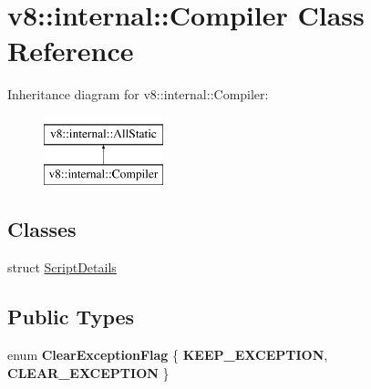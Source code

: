 \hypertarget{classv8_1_1internal_1_1Compiler}{}\section{v8\+:\+:internal\+:\+:Compiler Class Reference}
\label{classv8_1_1internal_1_1Compiler}
Inheritance diagram for v8\+:\+:internal\+:\+:Compiler\+:\begin{figure}[H]
\begin{center}
\leavevmode
\includegraphics[height=2.000000cm]{classv8_1_1internal_1_1Compiler}
\end{center}
\end{figure}
\subsection*{Classes}
\begin{DoxyCompactItemize}
\item 
struct \mbox{\hyperlink{structv8_1_1internal_1_1Compiler_1_1ScriptDetails}{Script\+Details}}
\end{DoxyCompactItemize}
\subsection*{Public Types}
\begin{DoxyCompactItemize}
\item 
\mbox{\label{classv8_1_1internal_1_1Compiler_ab59ab49f4051abae5d94e22871913b96}} 
enum {\bfseries Clear\+Exception\+Flag} \{ {\bfseries K\+E\+E\+P\+\_\+\+E\+X\+C\+E\+P\+T\+I\+ON}, 
{\bfseries C\+L\+E\+A\+R\+\_\+\+E\+X\+C\+E\+P\+T\+I\+ON}
 \}
\end{DoxyCompactItemize}
